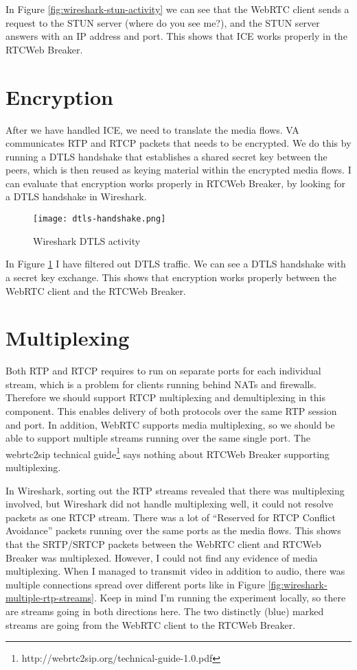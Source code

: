 In Figure \ref{fig:wireshark-stun-activity} we can see that the WebRTC client sends a request to the STUN server (where do you see me?), and the STUN server answers with an IP address and port. This shows that ICE works properly in the RTCWeb Breaker.

\section{Encryption}
After we have handled ICE, we need to translate the media flows. VA communicates RTP and RTCP packets that needs to be encrypted. We do this by running a DTLS handshake that establishes a shared secret key between the peers, which is then reused as keying material within the encrypted media flows. I can evaluate that encryption works properly in RTCWeb Breaker, by looking for a DTLS handshake in Wireshark.

\begin{figure}[here]
\centerline{\texttt{[image: dtls-handshake.png]}}
\caption{Wireshark DTLS activity}
\label{fig:wireshark-dtls-handshake}
\end{figure}

In Figure \ref{fig:wireshark-dtls-handshake} I have filtered out DTLS traffic. We can see a DTLS handshake with a secret key exchange. This shows that encryption works properly between the WebRTC client and the RTCWeb Breaker.

\section{Multiplexing}
Both RTP and RTCP requires to run on separate ports for each individual stream, which is a problem for clients running behind NATs and firewalls. Therefore we should support RTCP multiplexing and demultiplexing in this component. This enables delivery of both protocols over the same RTP session and port. In addition, WebRTC supports media multiplexing, so we should be able to support multiple streams running over the same single port. The webrtc2sip technical guide\footnote{http://webrtc2sip.org/technical-guide-1.0.pdf} says nothing about RTCWeb Breaker supporting multiplexing.

In Wireshark, sorting out the RTP streams revealed that there was multiplexing involved, but Wireshark did not handle multiplexing well, it could not resolve packets as one RTCP stream. There was a lot of ``Reserved for RTCP Conflict Avoidance'' packets running over the same ports as the media flows. This shows that the SRTP/SRTCP packets between the WebRTC client and RTCWeb Breaker was multiplexed. However, I could not find any evidence of media multiplexing. When I managed to transmit video in addition to audio, there was multiple connections spread over different ports like in Figure \ref{fig:wireshark-multiple-rtp-streams}. Keep in mind I'm running the experiment locally, so there are streams going in both directions here. The two distinctly (blue) marked streams are going from the WebRTC client to the RTCWeb Breaker.

